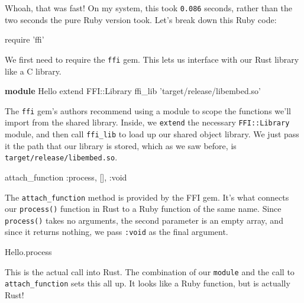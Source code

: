 \documentclass[a4paper,]{book}
\newenvironment{Shaded}{\begin{snugshade}}{\end{snugshade}}
\newcommand{\KeywordTok}[1]{\textcolor[rgb]{0.13,0.29,0.53}{\textbf{{#1}}}}
\newcommand{\DataTypeTok}[1]{\textcolor[rgb]{0.13,0.29,0.53}{{#1}}}
\newcommand{\StringTok}[1]{\textcolor[rgb]{0.31,0.60,0.02}{{#1}}}
\newcommand{\NormalTok}[1]{{#1}}
\begin{document}
Whoah, that was fast! On my system, this took \texttt{0.086} seconds,
rather than the two seconds the pure Ruby version took. Let's break down
this Ruby code:

\begin{Shaded}
\begin{Highlighting}[]
\NormalTok{require }\StringTok{'ffi'}
\end{Highlighting}
\end{Shaded}

We first need to require the \texttt{ffi} gem. This lets us interface
with our Rust library like a C library.

\begin{Shaded}
\begin{Highlighting}[]
\KeywordTok{module} \DataTypeTok{Hello}
  \NormalTok{extend }\DataTypeTok{FFI}\NormalTok{::}\DataTypeTok{Library}
  \NormalTok{ffi_lib }\StringTok{'target/release/libembed.so'}
\end{Highlighting}
\end{Shaded}

The \texttt{ffi} gem's authors recommend using a module to scope the
functions we'll import from the shared library. Inside, we
\texttt{extend} the necessary \texttt{FFI::Library} module, and then
call \texttt{ffi\_lib} to load up our shared object library. We just
pass it the path that our library is stored, which as we saw before, is
\texttt{target/release/libembed.so}.

\begin{Shaded}
\begin{Highlighting}[]
\NormalTok{attach_function }\StringTok{:process}\NormalTok{, [], }\StringTok{:void}
\end{Highlighting}
\end{Shaded}

The \texttt{attach\_function} method is provided by the FFI gem. It's
what connects our \texttt{process()} function in Rust to a Ruby function
of the same name. Since \texttt{process()} takes no arguments, the
second parameter is an empty array, and since it returns nothing, we
pass \texttt{:void} as the final argument.

\begin{Shaded}
\begin{Highlighting}[]
\DataTypeTok{Hello}\NormalTok{.process}
\end{Highlighting}
\end{Shaded}

This is the actual call into Rust. The combination of our
\texttt{module} and the call to \texttt{attach\_function} sets this all
up. It looks like a Ruby function, but is actually Rust!
\end{document}

